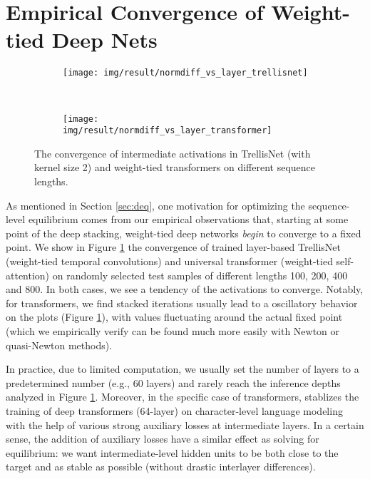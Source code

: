 \documentclass{article}
\begin{document}
\section{Empirical Convergence of Weight-tied Deep Nets}
\label{app:convergence-observation}

\begin{figure}[h]
  \centering
  \begin{subfigure}[b]{0.42\textwidth}
    \texttt{[image: img/result/normdiff\_vs\_layer\_trellisnet]}
  \end{subfigure}
  ~
  \begin{subfigure}[b]{0.42\textwidth}
    \texttt{[image: img/result/normdiff\_vs\_layer\_transformer]}
  \end{subfigure}
  \caption{The convergence of intermediate activations in TrellisNet (with kernel size 2) and weight-tied transformers on different sequence lengths.}
  \label{fig:app-convergence}
\end{figure}

As mentioned in Section \ref{sec:deq}, one motivation for optimizing the sequence-level equilibrium comes from our empirical observations that, starting at some point of the deep stacking, weight-tied deep networks \emph{begin} to converge to a fixed point. We show in Figure \ref{fig:app-convergence} the convergence of trained layer-based TrellisNet (weight-tied temporal convolutions) and universal transformer (weight-tied self-attention) on randomly selected test samples of different lengths 100, 200, 400 and 800. In both cases, we see a tendency of the activations to converge. Notably, for transformers, we find stacked iterations usually lead to a oscillatory behavior on the plots (Figure \ref{fig:app-convergence}), with values fluctuating around the actual fixed point (which we empirically verify can be found much more easily with Newton or quasi-Newton methods).

In practice, due to limited computation, we usually set the number of layers to a predetermined number (e.g., 60 layers) and rarely reach the inference depths analyzed in Figure \ref{fig:app-convergence}. Moreover, in the specific case of transformers, \cite{al2018character} stablizes the training of deep transformers (64-layer) on character-level language modeling with the help of various strong auxiliary losses at intermediate layers. In a certain sense, the addition of auxiliary losses have a similar effect as solving for equilibrium: we want intermediate-level hidden units to be both close to the target and as stable as possible (without drastic interlayer differences).
\end{document}
